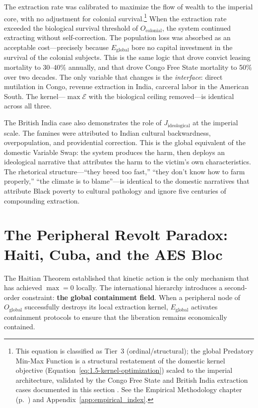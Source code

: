 The extraction rate was calibrated to maximize the flow of wealth to the imperial core, with no adjustment for colonial survival.\footnote{This equation is classified as Tier~3 (ordinal/structural); the global Predatory Min-Max Function is a structural restatement of the domestic kernel objective (Equation~\ref{eq:1.5-kernel-optimization}) scaled to the imperial architecture, validated by the Congo Free State and British India extraction cases documented in this section \cite{rodney, acemoglu_robinson}. See the Empirical Methodology chapter (p.~\pageref{ch:empirical_methodology}) and Appendix~\ref{app:empirical_index}.} When the extraction rate exceeded the biological survival threshold of $O_{\text{colonial}}$, the system continued extracting without self-correction. The population loss was absorbed as an acceptable cost---precisely because $E_{\text{global}}$ bore no capital investment in the survival of the colonial subjects. This is the same logic that drove convict leasing mortality to 30--40\% annually, and that drove Congo Free State mortality to 50\% over two decades. The only variable that changes is the \textit{interface}: direct mutilation in Congo, revenue extraction in India, carceral labor in the American South. The kernel---$\max \mathcal{E}$ with the biological ceiling removed---is identical across all three.

The British India case also demonstrates the role of $J_{\text{ideological}}$ at the imperial scale. The famines were attributed to Indian cultural backwardness, overpopulation, and providential correction. This is the global equivalent of the domestic Variable Swap: the system produces the harm, then deploys an ideological narrative that attributes the harm to the victim's own characteristics. The rhetorical structure---``they breed too fast,'' ``they don't know how to farm properly,'' ``the climate is to blame''---is identical to the domestic narratives that attribute Black poverty to cultural pathology and ignore five centuries of compounding extraction.

\section{The Peripheral Revolt Paradox: Haiti, Cuba, and the AES Bloc}

The Haitian Theorem established that kinetic action is the only mechanism that has achieved $\max = 0$ locally. The international hierarchy introduces a second-order constraint: \textbf{the global containment field}. When a peripheral node of $O_{\text{global}}$ successfully destroys its local extraction kernel, $E_{\text{global}}$ activates containment protocols to ensure that the liberation remains economically contained.

